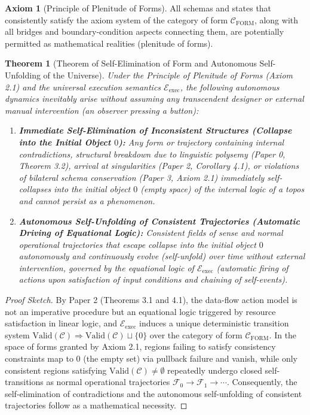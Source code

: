 \documentclass[11pt,a4paper]{article}
\theoremstyle{definition}
\newtheorem{axiom}{Axiom}[section]
\theoremstyle{plain}
\newtheorem{theorem}{Theorem}[section]
\begin{document}
\begin{axiom}[Principle of Plenitude of Forms]
All schemas and states that consistently satisfy the axiom system of the category of form $\mathcal{C}_{\mathrm{FORM}}$, along with all bridges and boundary-condition aspects connecting them, are potentially permitted as mathematical realities (plenitude of forms).
\end{axiom}

\begin{theorem}[Theorem of Self-Elimination of Form and Autonomous Self-Unfolding of the Universe]
Under the Principle of Plenitude of Forms (Axiom 2.1) and the universal execution semantics $\mathcal{E}_{\mathrm{exec}}$, the following autonomous dynamics inevitably arise without assuming any transcendent designer or external manual intervention (an observer pressing a button):
\begin{enumerate}
    \item \textbf{Immediate Self-Elimination of Inconsistent Structures (Collapse into the Initial Object $0$):} Any form or trajectory containing internal contradictions, structural breakdown due to linguistic polysemy (Paper 0, Theorem 3.2), arrival at singularities (Paper 2, Corollary 4.1), or violations of bilateral schema conservation (Paper 3, Axiom 2.1) immediately self-collapses into the initial object $0$ (empty space) of the internal logic of a topos and cannot persist as a phenomenon.
    \item \textbf{Autonomous Self-Unfolding of Consistent Trajectories (Automatic Driving of Equational Logic):} Consistent fields of sense and normal operational trajectories that escape collapse into the initial object $0$ autonomously and continuously evolve (self-unfold) over time without external intervention, governed by the equational logic of $\mathcal{E}_{\mathrm{exec}}$ (automatic firing of actions upon satisfaction of input conditions and chaining of self-events).
\end{enumerate}
\end{theorem}

\begin{proof}[Proof Sketch]
By Paper 2 (Theorems 3.1 and 4.1), the data-flow action model is not an imperative procedure but an equational logic triggered by resource satisfaction in linear logic, and $\mathcal{E}_{\mathrm{exec}}$ induces a unique deterministic transition system $\mathrm{Valid}(\mathcal{C}) \Rightarrow \mathrm{Valid}(\mathcal{C}) \sqcup \{0\}$ over the category of form $\mathcal{C}_{\mathrm{FORM}}$. In the space of forms granted by Axiom 2.1, regions failing to satisfy consistency constraints map to $0$ (the empty set) via pullback failure and vanish, while only consistent regions satisfying $\mathrm{Valid}(\mathcal{C}) \neq \emptyset$ repeatedly undergo closed self-transitions as normal operational trajectories $\mathcal{F}_0 \to \mathcal{F}_1 \to \cdots$. Consequently, the self-elimination of contradictions and the autonomous self-unfolding of consistent trajectories follow as a mathematical necessity.
\end{proof}
\end{document}
